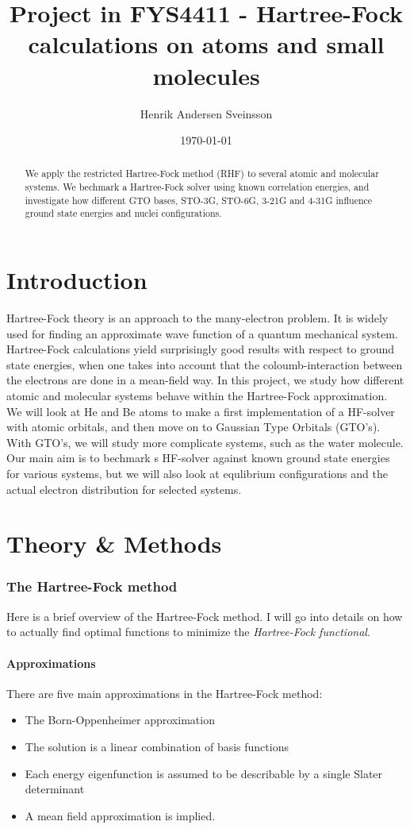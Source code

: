 \documentclass[a4paper,10pt, twocolumn, pre]{revtex4}
\begin{document}
\title{Project in FYS4411 - Hartree-Fock calculations on atoms and small molecules}
\author{Henrik Andersen Sveinsson}
\date{\today}

\begin{abstract}
We apply the restricted Hartree-Fock method (RHF) to several atomic and molecular systems. We bechmark a Hartree-Fock solver using known correlation energies, and investigate how different GTO bases, STO-3G, STO-6G, 3-21G and 4-31G influence ground state energies and nuclei configurations.
\end{abstract}
\maketitle
\tableofcontents


\part{Introduction}
Hartree-Fock theory is an approach to the many-electron problem. It is widely used for finding an approximate wave function of a quantum mechanical system. Hartree-Fock calculations yield surprisingly good results with respect to ground state energies, when one takes into account that the coloumb-interaction between the electrons are done in a mean-field way. In this project, we study how different atomic and molecular systems behave within the Hartree-Fock approximation. We will look at He and Be atoms to make a first implementation of a HF-solver with atomic orbitals, and then move on to Gaussian Type Orbitals (GTO's). With GTO's, we will study more complicate systems, such as the water molecule. Our main aim is to bechmark s HF-solver against known ground state energies for various systems, but we will also look at equlibrium configurations and the actual electron distribution for selected systems. 
\part{Theory \& Methods}
\section{The Hartree-Fock method}
Here is a brief overview of the Hartree-Fock method. I will go into details on how to actually find optimal functions to minimize the \emph{Hartree-Fock functional}. 
\subsection{Approximations}
There are five main approximations in the Hartree-Fock method:
\begin{itemize}
 \item The Born-Oppenheimer approximation
 \item The solution is a linear combination of basis functions
 \item Each energy eigenfunction is assumed to be describable by a single Slater determinant
 \item A mean field approximation is implied. 
\end{itemize}
\end{document}
